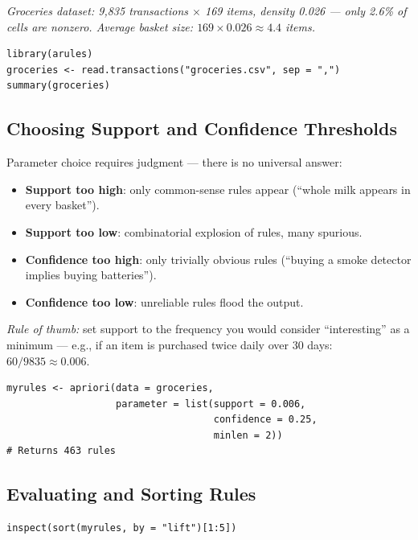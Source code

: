 \documentclass[11pt]{article}
\begin{document}
\textit{Groceries dataset: 9,835 transactions $\times$ 169 items, density
0.026 --- only 2.6\% of cells are nonzero. Average basket size:
$169 \times 0.026 \approx 4.4$ items.}

\begin{verbatim}
library(arules)
groceries <- read.transactions("groceries.csv", sep = ",")
summary(groceries)
\end{verbatim}

\subsection{Choosing Support and Confidence Thresholds}
Parameter choice requires judgment --- there is no universal answer:

\begin{itemize}
    \item \textbf{Support too high}: only common-sense rules appear
      (``whole milk appears in every basket'').
    \item \textbf{Support too low}: combinatorial explosion of rules,
      many spurious.
    \item \textbf{Confidence too high}: only trivially obvious rules
      (``buying a smoke detector implies buying batteries'').
    \item \textbf{Confidence too low}: unreliable rules flood the output.
\end{itemize}

\textit{Rule of thumb:} set support to the frequency you would consider
``interesting'' as a minimum --- e.g., if an item is purchased twice daily
over 30 days: $60/9835 \approx 0.006$.

\begin{verbatim}
myrules <- apriori(data = groceries,
                   parameter = list(support = 0.006,
                                    confidence = 0.25,
                                    minlen = 2))
# Returns 463 rules
\end{verbatim}

\subsection{Evaluating and Sorting Rules}
\begin{verbatim}
inspect(sort(myrules, by = "lift")[1:5])
\end{verbatim}
\end{document}
